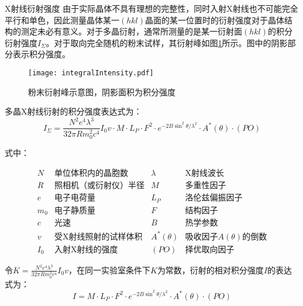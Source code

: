 \documentclass[a4paper,12pt]{article}
\begin{document}
\begin{section}{X射线衍射强度}
由于实际晶体不具有理想的完整性，同时入射X射线也不可能完全平行和单色，因此测量晶体某一$(hkl)$晶面的某一位置时的衍射强度对于晶体结构的测定未必有意义。对于多晶衍射，通常所测量的是某一衍射面$(hkl)$的积分衍射强度$I_\Sigma$。对于取向完全随机的粉末试样，其衍射峰如图\ref{fig:integralIntensity}所示。图中的阴影部分表示积分强度。

\begin{figure}[htbp]
\centering
\texttt{[image: integralIntensity.pdf]}
\caption{粉末衍射峰示意图，阴影面积为积分强度}
\label{fig:integralIntensity}
\end{figure}

多晶X射线衍射的积分强度表达式为：\[I_\Sigma=\dfrac{N^2e^4\lambda^3}{32\pi Rm_0^2c^4}I_0v\cdot M\cdot L_P\cdot F^2\cdot e^{-2B \sin^2\theta/\lambda^2}\cdot A^*(\theta)\cdot (PO)\]

式中：

\[\begin{array}{llll}
N & \text{单位体积内的晶胞数} & \lambda & \text{X射线波长}\\
R & \text{照相机（或衍射仪）半径} & M & \text{多重性因子}\\
e & \text{电子电荷量} & L_P & \text{洛伦兹偏振因子}\\
m_0 & \text{电子静质量} & F & \text{结构因子}\\
c & \text{光速} & B & \text{热学参数}\\
v & \text{受X射线照射的试样体积} & A^*(\theta) & \text{吸收因子$A(\theta)$的倒数}\\
I_0 & \text{入射X射线的强度} & (PO) & \text{择优取向因子}
\end{array}\]


令$K=\tfrac{N^2e^4\lambda^3}{32\pi Rm_0^2c^4}I_0v$，在同一实验室条件下$K$为常数，衍射的相对积分强度$I$的表达式为：\[I=M\cdot L_P\cdot F^2\cdot e^{-2B \sin^2\theta/\lambda^2}\cdot A^*(\theta)\cdot (PO)\]
\end{section}
\end{document}
